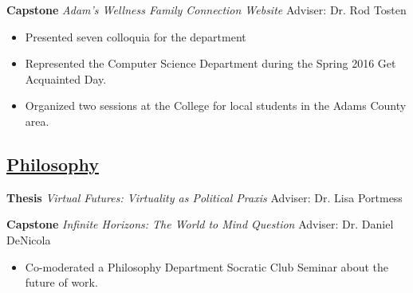 \documentclass[11pt]{article}
\begin{document}
\textbf{Capstone} \textit{Adam's Wellness Family Connection Website} \hfill Adviser: Dr. Rod Tosten

\begin{itemize}[noitemsep]
\item Presented seven colloquia for the department
\item Represented the Computer Science Department during the Spring 2016 Get Acquainted Day. 
\item Organized two  sessions at the College for local students in the Adams County area.
\end{itemize}

\subsection*{\underline{Philosophy}}
\textbf{Thesis} \textit{Virtual Futures: Virtuality as Political Praxis} \hfill Adviser: Dr. Lisa Portmess

\textbf{Capstone} \textit{Infinite Horizons: The World to Mind Question} \hfill Adviser: Dr. Daniel DeNicola

\begin{itemize}
\item Co-moderated a Philosophy Department Socratic Club Seminar about the future of work.
\end{itemize}
\end{document}
